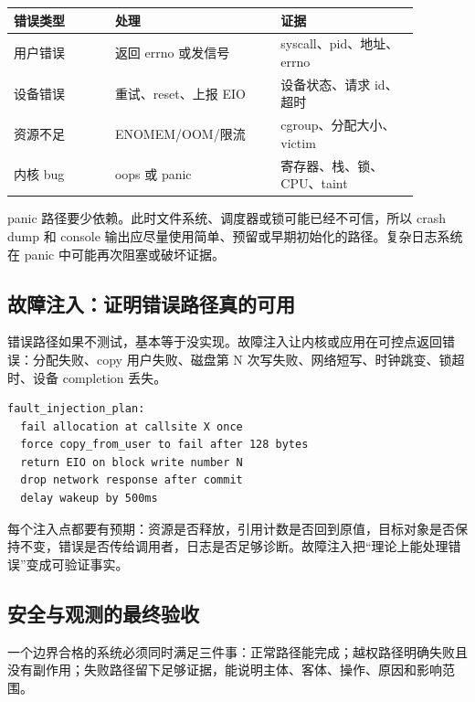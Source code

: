 \begin{longtable}{|p{0.22\linewidth}|p{0.36\linewidth}|p{0.3\linewidth}|}
\toprule
错误类型 & 处理 & 证据 \\
\midrule
用户错误 & 返回 errno 或发信号 & syscall、pid、地址、errno \\\tablerowrule
设备错误 & 重试、reset、上报 EIO & 设备状态、请求 id、超时 \\\tablerowrule
资源不足 & ENOMEM/OOM/限流 & cgroup、分配大小、victim \\\tablerowrule
内核 bug & oops 或 panic & 寄存器、栈、锁、CPU、taint \\
\bottomrule
\end{longtable}

panic 路径要少依赖。此时文件系统、调度器或锁可能已经不可信，所以 crash dump 和 console 输出应尽量使用简单、预留或早期初始化的路径。复杂日志系统在 panic 中可能再次阻塞或破坏证据。

\subsection{故障注入：证明错误路径真的可用}

错误路径如果不测试，基本等于没实现。故障注入让内核或应用在可控点返回错误：分配失败、copy 用户失败、磁盘第 N 次写失败、网络短写、时钟跳变、锁超时、设备 completion 丢失。

\begin{lstlisting}
fault_injection_plan:
  fail allocation at callsite X once
  force copy_from_user to fail after 128 bytes
  return EIO on block write number N
  drop network response after commit
  delay wakeup by 500ms
\end{lstlisting}

每个注入点都要有预期：资源是否释放，引用计数是否回到原值，目标对象是否保持不变，错误是否传给调用者，日志是否足够诊断。故障注入把“理论上能处理错误”变成可验证事实。

\subsection{安全与观测的最终验收}

\begin{rubricbox}
一个边界合格的系统必须同时满足三件事：正常路径能完成；越权路径明确失败且没有副作用；失败路径留下足够证据，能说明主体、客体、操作、原因和影响范围。
\end{rubricbox}
